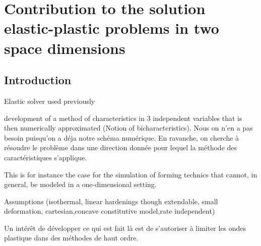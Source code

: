 \chapter{Contribution to the solution elastic-plastic problems in two space dimensions}

\section*{Introduction}
Elastic solver used previously

\cite{Clifton_thesis} development of a method of characteristics in 3 independent variables that is then numerically approximated (Notion of bicharacteristics). Nous on n'en a pas besoin puisqu'on a déja notre schéma numérique. En ravanche, on cherche à résoudre le problème dans une direction donnée pour lequel la méthode des caractéristiques s'applique.

This is for instance the case for the simulation of forming technics that cannot, in general, be modeled in a one-dimensional setting.

Assumptions (isothermal, linear hardenings though extendable, small deformation, cartesian,concave constitutive model,rate independent)

Un intérêt de développer ce qui est fait là est de s'autoriser à limiter les ondes plastique dans des méthodes de haut ordre.
